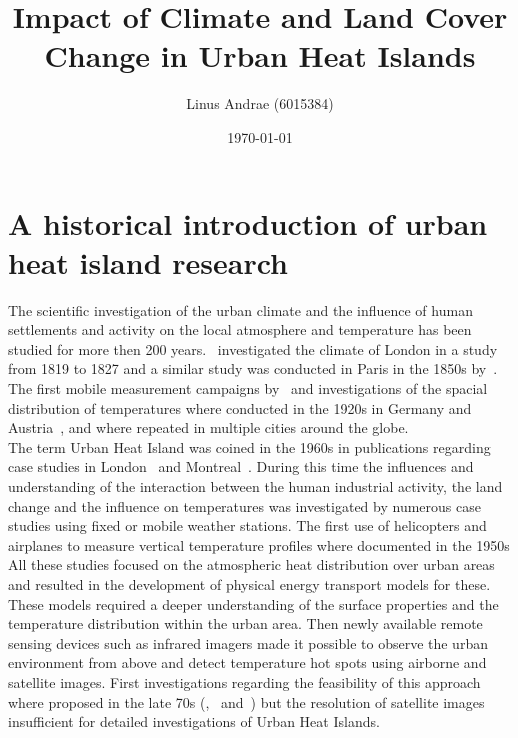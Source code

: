 \documentclass[a4paper, english]{article}
\title{\textbf{\huge Impact of Climate and Land Cover Change in Urban Heat Islands} }
\author{Linus Andrae (6015384)}
\date{\today}
\begin{document}
  
  \singlespacing%
  \newpage

  
  \newpage

  \tableofcontents
  \listoffigures
  \listoftables
  \newpage
  \printglossary[title=Acronyms, type=acronym]
  \printglossary%
\newpage

\section{A historical introduction of urban heat island research}
  The scientific investigation of the urban climate and the influence of human settlements and activity on the local atmosphere and temperature has been studied for more then 200 years.%
  \cite{Howard1833}~investigated the climate of London in a study from 1819 to 1827 and a similar study was conducted in Paris in the 1850s by~\cite{renou1862differences}.%
  The first mobile measurement campaigns by~\cite{peppler1929auto} and investigations of the spacial distribution of temperatures where conducted in the 1920s in Germany and Austria~\cite{tollner1932untersuchungen}, and where repeated in multiple cities around the globe.\\%
  The term Urban Heat Island was coined in the 1960s in publications regarding case studies in London~\cite{Chandler1961} and Montreal~\cite{Oke1968}.
  During this time the influences and understanding of the interaction between the human industrial activity, the land change and the influence on temperatures was investigated by numerous case studies using fixed or mobile weather stations.
  The first use of helicopters and airplanes to measure vertical temperature profiles where documented in the 1950s  
  All these studies focused on the atmospheric heat distribution over urban areas and resulted in the development of physical energy transport models for these. 
  These models required a deeper understanding of the surface properties and the temperature distribution within the urban area. 
  Then newly available remote sensing devices such as infrared imagers made it possible to observe the urban environment from above and detect temperature hot spots using airborne and satellite images.  
  First investigations regarding the feasibility of this approach where proposed in the late 70s (\cite{Watson1975},~\cite{Carlson1977} and~\cite{Block1978}) but the resolution of satellite images insufficient for detailed investigations of Urban Heat Islands.\\
\end{document}
